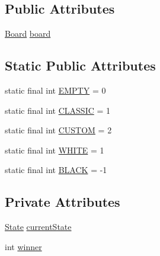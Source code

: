 \subsection*{Public Attributes}
\begin{DoxyCompactItemize}
\item 
\hyperlink{classgame_1_1_board}{Board} \hyperlink{classgame_1_1_game_a37e0047161981c19ff69a8cfdc633dd1}{board}
\end{DoxyCompactItemize}
\subsection*{Static Public Attributes}
\begin{DoxyCompactItemize}
\item 
static final int \hyperlink{classgame_1_1_game_a787b82f6054bed8334222d3aef9179e5}{E\-M\-P\-T\-Y} = 0
\item 
static final int \hyperlink{classgame_1_1_game_a8bca27c17a917044170e6d5d127736af}{C\-L\-A\-S\-S\-I\-C} = 1
\item 
static final int \hyperlink{classgame_1_1_game_a3b51812195a43b53c46afc14482e5d7b}{C\-U\-S\-T\-O\-M} = 2
\item 
static final int \hyperlink{classgame_1_1_game_ac15f5930449e1e16d9b7d4dd10b9c957}{W\-H\-I\-T\-E} = 1
\item 
static final int \hyperlink{classgame_1_1_game_a64750fe2b8cab1a3c14015732368118c}{B\-L\-A\-C\-K} = -\/1
\end{DoxyCompactItemize}
\subsection*{Private Attributes}
\begin{DoxyCompactItemize}
\item 
\hyperlink{classgame_1_1_game_1_1_state}{State} \hyperlink{classgame_1_1_game_a59957adcd9db3f8c3a9cda28729c881d}{current\-State}
\item 
int \hyperlink{classgame_1_1_game_aa55030dc8792bb216e934ca6a7d389fb}{winner}
\end{DoxyCompactItemize}


